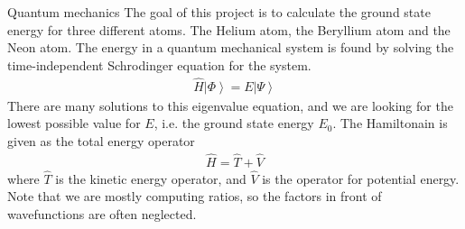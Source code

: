 \documentclass[a4paper, 12pt, titlepage]{article}
\begin{document}
\begin{section}{Quantum mechanics}
 The goal of this project is to calculate the ground state energy for three different atoms. The Helium atom, the Beryllium atom and the Neon atom. The energy in a quantum mechanical system is found by solving the time-independent Schrodinger equation for the system. 
 \begin{align}
 	\hat H \left| \Phi \right> = E \left| \Psi \right>
 \end{align}
 There are many solutions to this eigenvalue equation, and we are looking for the lowest possible value for $E$, i.e. the ground state energy $E_0$. The Hamiltonain is given as the total energy operator
 \begin{align}
 	\hat H = \hat T + \hat V
 \end{align}
 where $\hat T$ is the kinetic energy operator, and $\hat V$ is the operator for potential energy. Note that we are mostly computing ratios, so the factors in front of wavefunctions are often neglected. 


\end{section}
\end{document}
